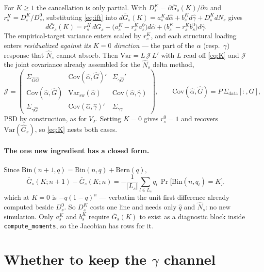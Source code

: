 \documentclass[11pt]{article}
\newcommand{\Gbar}{\bar{G}}
\newcommand{\Ghat}{\hat{G}}
\newcommand{\ahat}{\hat{\alpha}}
\newcommand{\ghat}{\hat{\gamma}}
\newcommand{\Nhat}{\hat{N}}
\newcommand{\qhat}{\hat{q}}
\begin{document}
For $K\ge 1$ the cancellation is only partial. With
$D_s^{K}=\partial\Gbar_s(K)/\partial n$ and $r_s^{K}=D_s^{K}/D_s^{0}$, substituting
\eqref{eq:ift} into $d\Gbar_s(K)=a_s^{K}d\ahat+b_s^{K}d\ghat+D_s^{K}dN_s$ gives
\begin{equation}
d\Gbar_s(K)=r_s^{K}\,d\Ghat_s
+\big(a_s^{K}-r_s^{K}a_s^{0}\big)d\ahat
+\big(b_s^{K}-r_s^{K}b_s^{0}\big)d\ghat .
\label{eq:K}
\end{equation}
The empirical-target variance enters scaled by $r_s^{K}$, and each structural loading enters
\emph{residualized against its $K=0$ direction} --- the part of the $\alpha$ (resp.\ $\gamma$)
response that $\Nhat_s$ cannot absorb. Then
$\mathrm{Var}=L\,\mathcal{J}\,L'$ with $L$ read off \eqref{eq:K} and $\mathcal{J}$ the joint
covariance already assembled for the $\Nhat_s$ delta method,
\begin{equation}
\mathcal{J}=
\begin{pmatrix}
\Sigma_{\Ghat\Ghat} & \mathrm{Cov}(\ahat,\Ghat)' & \Sigma_{\gamma\Ghat}'\\
\mathrm{Cov}(\ahat,\Ghat) & \mathrm{Var}_{\mathrm{sw}}(\ahat) & \mathrm{Cov}(\ahat,\ghat)\\
\Sigma_{\gamma\Ghat} & \mathrm{Cov}(\ahat,\ghat)' & \Sigma_{\gamma\gamma}
\end{pmatrix},
\qquad
\mathrm{Cov}(\ahat,\Ghat)=P\,\Sigma_{\mathrm{data}}[:,G],
\end{equation}
PSD by construction, as for $V_T$. Setting $K=0$ gives $r_s^{0}=1$ and recovers
$\mathrm{Var}(\Ghat_s)$, so \eqref{eq:K} nests both cases.

\paragraph{The one new ingredient has a closed form.}
Since $\mathrm{Bin}(n+1,q)=\mathrm{Bin}(n,q)+\mathrm{Bern}(q)$,
\begin{equation}
\Gbar_s(K;n+1)-\Gbar_s(K;n)
=-\frac{1}{|L_s|}\sum_{l\in L_s} q_l\,\Pr\!\big[\mathrm{Bin}(n,q_l)=K\big],
\end{equation}
which at $K=0$ is $-q(1-q)^n$ --- verbatim the unit first difference already computed beside
$D_s^{0}$. So $D_s^{K}$ costs one line and needs only $\qhat$ and $\Nhat_s$: no new
simulation. Only $a_s^{K}$ and $b_s^{K}$ require $\Gbar_s(K)$ to exist as a diagnostic block
inside \texttt{compute\_moments}, so the Jacobian has rows for it.

\section{Whether to keep the $\gamma$ channel}
\end{document}
